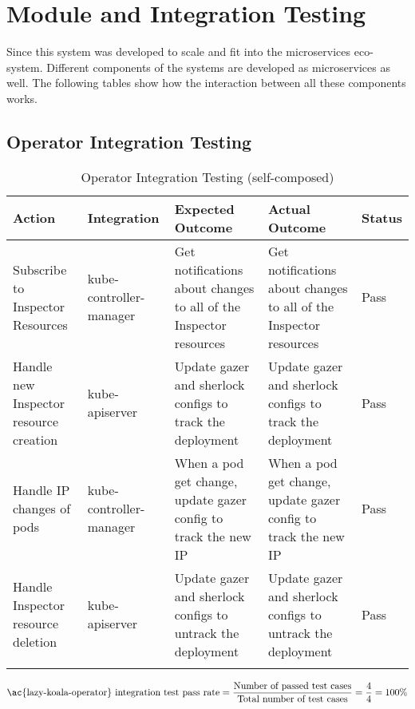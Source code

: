 \section{Module and Integration Testing}\label{sec:module-integration-testing}

Since this system was developed to scale and fit into the microservices eco-system. Different components of the systems are developed as microservices as well. The following tables show how the interaction between all these components works.

\subsection{Operator Integration Testing}

\begin{longtable}{|p{30mm}|p{21mm}|p{40mm}|p{40mm}|p{10mm}|}
    \hline
    \textbf{Action} &
    \textbf{Integration} &
    \textbf{Expected Outcome} &
    \textbf{Actual Outcome} &
    \textbf{Status} \\ \hline
    Subscribe to Inspector Resources &
    kube-controller-manager &
    Get notifications about changes to all of the Inspector resources &
    Get notifications about changes to all of the Inspector resources &
    Pass \\ \hline
    Handle new Inspector resource creation &
    kube-apiserver &
    Update \ac{gazer} and \ac{sherlock} configs to track the deployment &
    Update \ac{gazer} and \ac{sherlock} configs to track the deployment &
    Pass \\ \hline
    Handle IP changes of pods &
    kube-controller-manager &
    When a pod get change, update \ac{gazer} config to track the new IP &
    When a pod get change, update \ac{gazer} config to track the new IP &
    Pass \\ \hline
    Handle Inspector resource deletion &
    kube-apiserver &
    Update \ac{gazer} and \ac{sherlock} configs to untrack the deployment &
    Update \ac{gazer} and \ac{sherlock} configs to untrack the deployment &
    Pass \\ \hline
    \caption{Operator Integration Testing (self-composed)}
\end{longtable}

\begingroup
\setlength{\abovedisplayskip}{-0.5cm}
\[
\text{\ac{lazy-koala-operator} integration test pass rate} = \frac{\text{Number of passed test cases}}{\text{Total number of test cases}} = \frac{4}{4} = 100\%
\]
\endgroup

